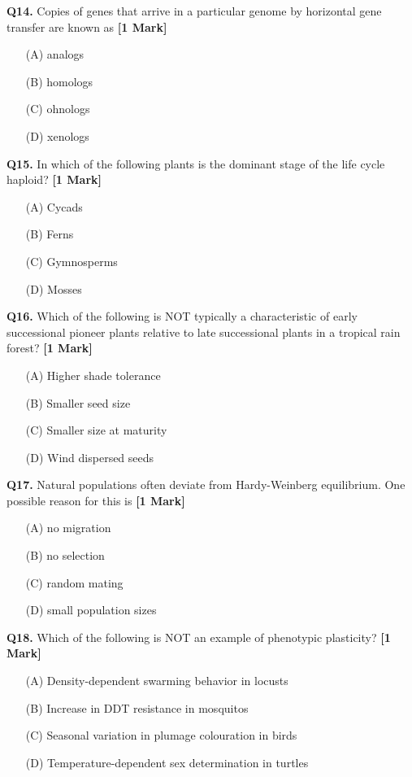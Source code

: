 \documentclass[11pt]{article}
\newcommand{\questiona}[2]{
    \noindent\textbf{Q#2.} #1 \hfill \textbf{[1 Mark]}
}
\begin{document}
\questiona{Copies of genes that arrive in a particular genome by horizontal gene transfer are known as}{14}
\begin{enumerate}
    \item[(A)] analogs
    \item[(B)] homologs
    \item[(C)] ohnologs
    \item[(D)] xenologs
\end{enumerate}
\vspace{0.5cm}

\questiona{In which of the following plants is the dominant stage of the life cycle haploid?}{15}
\begin{enumerate}
    \item[(A)] Cycads
    \item[(B)] Ferns
    \item[(C)] Gymnosperms
    \item[(D)] Mosses
\end{enumerate}
\vspace{0.5cm}

\questiona{Which of the following is NOT typically a characteristic of early successional pioneer plants relative to late successional plants in a tropical rain forest?}{16}
\begin{enumerate}
    \item[(A)] Higher shade tolerance
    \item[(B)] Smaller seed size
    \item[(C)] Smaller size at maturity
    \item[(D)] Wind dispersed seeds
\end{enumerate}
\vspace{0.5cm}

\questiona{Natural populations often deviate from Hardy-Weinberg equilibrium. One possible reason for this is}{17}
\begin{enumerate}
    \item[(A)] no migration
    \item[(B)] no selection
    \item[(C)] random mating
    \item[(D)] small population sizes
\end{enumerate}
\vspace{0.5cm}

\questiona{Which of the following is NOT an example of phenotypic plasticity?}{18}
\begin{enumerate}
    \item[(A)] Density-dependent swarming behavior in locusts
    \item[(B)] Increase in DDT resistance in mosquitos
    \item[(C)] Seasonal variation in plumage colouration in birds
    \item[(D)] Temperature-dependent sex determination in turtles
\end{enumerate}
\vspace{0.5cm}
\end{document}

